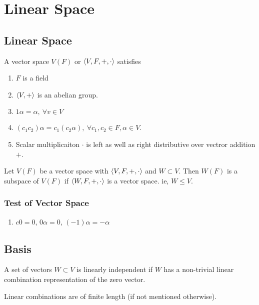 \chapter{Linear Space}
\section{Linear Space}
\begin{definition}
	A vector space $V(F)$ or $\left\langle V,F,+,\cdot \right\rangle$ satisfies
	\begin{enumerate}
		\item $F$ is a field
		\item $\left\langle V,+ \right\rangle$ is an abelian group.
		\item $1\alpha=\alpha,\ \forall v \in V$
		\item $(c_1c_2)\alpha = c_1 (c_2\alpha),\ \forall c_1,c_2 \in F, \alpha \in V$.
		\item Scalar multiplicaiton $\cdot$ is left as well as right distributive over vectror addition $+$.
	\end{enumerate}
\end{definition}

\begin{definition}[subspace]
	Let $V(F)$ be a vector space with $\left\langle V,F,+,\cdot \right\rangle$ and $W \subset V$.
	Then $W(F)$ is a subspace of $V(F)$ if $\left\langle W,F,+,\cdot \right\rangle$ is a vector space.
	ie, $W \le V$.
\end{definition}

\subsection{Test of Vector Space}
\begin{enumerate}
	\item $c0 = 0$, $0\alpha = 0$, $(-1)\alpha = -\alpha$
\end{enumerate}

\section{Basis}
\begin{definition}
	A set of vectors $W \subset V$ is linearly independent if $W$ has a non-trivial linear combination representation of the zero vector.
\end{definition}
\begin{note}
	Linear combinations are of finite length (if not mentioned otherwise).
\end{note}


